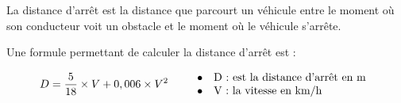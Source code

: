 \documentclass[10pt]{article}
\begin{document}
\setlength\parindent{0mm}
\pagestyle{fancy}
\thispagestyle{empty}
    
    
    




\medskip

La distance d'arrêt est la distance que parcourt un véhicule entre le moment où son conducteur voit un obstacle et le moment où le véhicule s'arrête.

Une formule permettant de calculer la distance d'arrêt est :

\[D = \dfrac{5}{18} \times  V + 0,006 \times  V^2 \qquad \begin{tabular}{l}
$\bullet$~~ D : \text{est la distance d'arrêt en m}\\
$\bullet$~~ V : \text{la vitesse en km/h}
\end{tabular}\]
\end{document}
